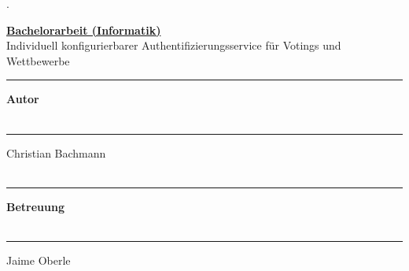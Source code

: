 \begin{titlepage}


\begin{minipage}[b]{0.117\textwidth}
\hskip 0.05cm
\end{minipage}
\begin{minipage}[b]{0.91\textwidth}
\begin{tiny}.\end{tiny}\vskip 2.8cm
	{\huge
	
	\textbf{\underline{Bachelorarbeit (Informatik)}}\\
	
	Individuell konfigurierbarer Authentifizierungsservice für Votings und Wettbewerbe
	\vskip 3.5cm}
	
	\begin{minipage}[b]{0.27\textwidth}
	\hrule\vskip 0.5cm
		\textbf{Autor}\\
		\\
	\end{minipage}
	\begin{minipage}[b]{0.03\textwidth}
	\hskip 0.5cm
	\end{minipage}
	\begin{minipage}[b]{0.7\textwidth}
	\hrule\vskip 0.5cm
	    Christian Bachmann\\
	    \\
	\end{minipage}
	
	\begin{minipage}[b]{0.27\textwidth}
	\hrule\vskip 0.5cm
		\textbf{Betreuung}\\
		\\
	\end{minipage}
	\begin{minipage}[b]{0.03\textwidth}
	\hskip 0.5cm
	\end{minipage}
	\begin{minipage}[b]{0.7\textwidth}
	\hrule\vskip 0.5cm
		Jaime Oberle\\
		 \\
	
	\end{minipage}
	
	

\end{minipage}
\end{titlepage}
